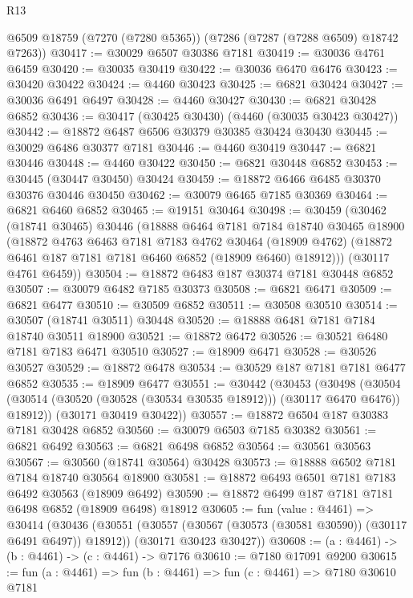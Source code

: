 \begin{lexlean}{R13}
\begin{coremodule}
    @6509
    @18759
    (@7270 (@7280 @5365))
    (@7286 (@7287 (@7288 @6509) @18742 @7263))
@30417 := @30029 @6507 @30386 @7181
@30419 := @30036 @4761 @6459
@30420 := @30035 @30419
@30422 := @30036 @6470 @6476
@30423 := @30420 @30422
@30424 := @4460 @30423
@30425 := @6821 @30424
@30427 := @30036 @6491 @6497
@30428 := @4460 @30427
@30430 := @6821 @30428 @6852
@30436 := @30417 (@30425 @30430) (@4460 (@30035 @30423 @30427))
@30442 := @18872 @6487 @6506 @30379 @30385 @30424 @30430
@30445 := @30029 @6486 @30377 @7181
@30446 := @4460 @30419
@30447 := @6821 @30446
@30448 := @4460 @30422
@30450 := @6821 @30448 @6852
@30453 := @30445 (@30447 @30450) @30424
@30459 := @18872 @6466 @6485 @30370 @30376 @30446 @30450
@30462 := @30079 @6465 @7185 @30369
@30464 := @6821 @6460 @6852
@30465 := @19151 @30464
@30498 := @30459
    (@30462
      (@18741 @30465)
      @30446
      (@18888
        @6464
        @7181
        @7184
        @18740
        @30465
        @18900
        (@18872
          @4763
          @6463
          @7181
          @7183
          @4762
          @30464
          (@18909 @4762)
          (@18872 @6461 @187 @7181 @7181 @6460 @6852 (@18909 @6460) @18912)))
      (@30117 @4761 @6459))
@30504 := @18872 @6483 @187 @30374 @7181 @30448 @6852
@30507 := @30079 @6482 @7185 @30373
@30508 := @6821 @6471
@30509 := @6821 @6477
@30510 := @30509 @6852
@30511 := @30508 @30510
@30514 := @30507 (@18741 @30511) @30448
@30520 := @18888 @6481 @7181 @7184 @18740 @30511 @18900
@30521 := @18872 @6472
@30526 := @30521 @6480 @7181 @7183 @6471 @30510
@30527 := @18909 @6471
@30528 := @30526 @30527
@30529 := @18872 @6478
@30534 := @30529 @187 @7181 @7181 @6477 @6852
@30535 := @18909 @6477
@30551 := @30442
    (@30453
      (@30498
        (@30504 (@30514 (@30520 (@30528 (@30534 @30535 @18912))) (@30117 @6470 @6476)) @18912))
      (@30171 @30419 @30422))
@30557 := @18872 @6504 @187 @30383 @7181 @30428 @6852
@30560 := @30079 @6503 @7185 @30382
@30561 := @6821 @6492
@30563 := @6821 @6498 @6852
@30564 := @30561 @30563
@30567 := @30560 (@18741 @30564) @30428
@30573 := @18888 @6502 @7181 @7184 @18740 @30564 @18900
@30581 := @18872 @6493 @6501 @7181 @7183 @6492 @30563 (@18909 @6492)
@30590 := @18872 @6499 @187 @7181 @7181 @6498 @6852 (@18909 @6498) @18912
@30605 := fun (value : @4461) =>
  @30414
    (@30436
      (@30551 (@30557 (@30567 (@30573 (@30581 @30590)) (@30117 @6491 @6497)) @18912))
      (@30171 @30423 @30427))
@30608 := (a : @4461) -> (b : @4461) -> (c : @4461) -> @7176
@30610 := @7180 @17091 @9200
@30615 := fun (a : @4461) => fun (b : @4461) => fun (c : @4461) => @7180 @30610 @7181

\end{coremodule}
\end{lexlean}
